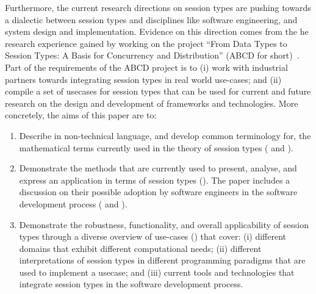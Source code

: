 Furthermore, the current research directions on session types are
pushing towards a dialectic between session types and disciplines
like software engineering, and system design and implementation.
Evidence on this direction comes from the he research experience
gained by working on the project
``From Data Types to Session Types: A Basis for Concurrency and Distribution''
(ABCD for short)~\cite{ABCD}.
Part of the requirements of the ABCD project is to (i)
work with industrial partners towards integrating
session types in real world use-cases; and (ii)
compile a set of usecases
for session types that can be used for current and future research on
the design and development of frameworks and technologies.
%
More concretely, the aims of this paper are to:
%
\begin{enumerate}
	\item	Describe in non-technical language, and develop common terminology
			for, the mathematical terms currently used in the theory of
			session types ( and ).

	\item	Demonstrate the methods that are currently used to present,
			analyse, and express an application in terms of session types
			().
			The paper includes a discussion on their possible adoption by
			software engineers in the software development process
			( and ).


	\item	Demonstrate the robustness, functionality, and overall applicability
			of session types through a diverse overview of use-cases ()
			that cover:
			(i) different domains that exhibit different computational needs;
			(ii) different interpretations of session types in different
			programming paradigms that are used to implement a usecase; and
			(iii) current tools and technologies that integrate session types
			in the software development process.
%
%
%
%


\end{enumerate}
